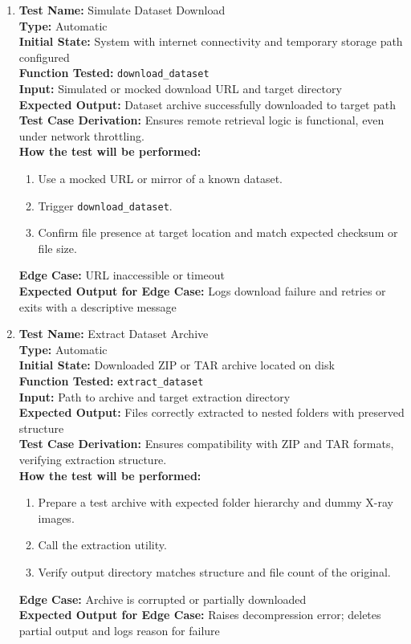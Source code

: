 \documentclass[12pt, titlepage]{article}
\begin{document}
\begin{enumerate}
  \item \textbf{Test Name:} Simulate Dataset Download\\
  \textbf{Type:} Automatic\\
  \textbf{Initial State:} System with internet connectivity and temporary storage path configured\\
  \textbf{Function Tested:} \verb|download_dataset|\\
  \textbf{Input:} Simulated or mocked download URL and target directory\\
  \textbf{Expected Output:} Dataset archive successfully downloaded to target path\\
  \textbf{Test Case Derivation:} Ensures remote retrieval logic is functional, even under network throttling.\\
  \textbf{How the test will be performed:}
  \begin{enumerate}
    \item Use a mocked URL or mirror of a known dataset.
    \item Trigger \verb|download_dataset|.
    \item Confirm file presence at target location and match expected checksum or file size.
  \end{enumerate}
  \textbf{Edge Case:} URL inaccessible or timeout\\
  \textbf{Expected Output for Edge Case:} Logs download failure and retries or exits with a descriptive message\\
  \vspace{1em}

  \item \textbf{Test Name:} Extract Dataset Archive\\
  \textbf{Type:} Automatic\\
  \textbf{Initial State:} Downloaded ZIP or TAR archive located on disk\\
  \textbf{Function Tested:} \verb|extract_dataset|\\
  \textbf{Input:} Path to archive and target extraction directory\\
  \textbf{Expected Output:} Files correctly extracted to nested folders with preserved structure\\
  \textbf{Test Case Derivation:} Ensures compatibility with ZIP and TAR formats, verifying extraction structure.\\
  \textbf{How the test will be performed:}
  \begin{enumerate}
    \item Prepare a test archive with expected folder hierarchy and dummy X-ray images.
    \item Call the extraction utility.
    \item Verify output directory matches structure and file count of the original.
  \end{enumerate}
  \textbf{Edge Case:} Archive is corrupted or partially downloaded\\
  \textbf{Expected Output for Edge Case:} Raises decompression error; deletes partial output and logs reason for failure\\
\end{enumerate}
\end{document}
